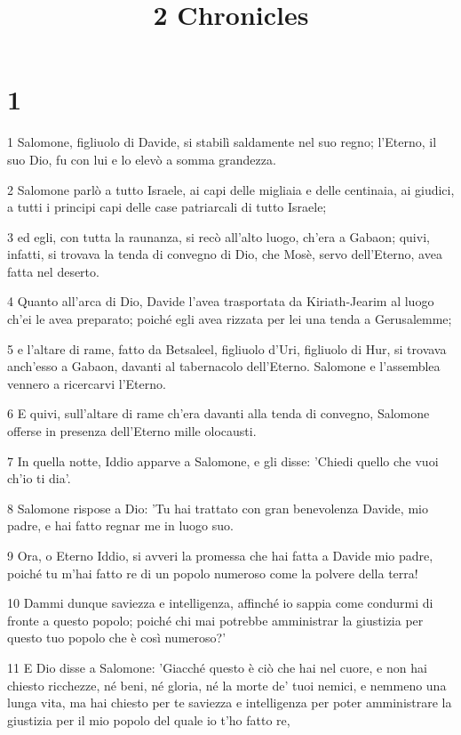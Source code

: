 

\title{2 Chronicles}


\chapter{1}

\par 1 Salomone, figliuolo di Davide, si stabilì saldamente nel suo regno; l'Eterno, il suo Dio, fu con lui e lo elevò a somma grandezza.
\par 2 Salomone parlò a tutto Israele, ai capi delle migliaia e delle centinaia, ai giudici, a tutti i principi capi delle case patriarcali di tutto Israele;
\par 3 ed egli, con tutta la raunanza, si recò all'alto luogo, ch'era a Gabaon; quivi, infatti, si trovava la tenda di convegno di Dio, che Mosè, servo dell'Eterno, avea fatta nel deserto.
\par 4 Quanto all'arca di Dio, Davide l'avea trasportata da Kiriath-Jearim al luogo ch'ei le avea preparato; poiché egli avea rizzata per lei una tenda a Gerusalemme;
\par 5 e l'altare di rame, fatto da Betsaleel, figliuolo d'Uri, figliuolo di Hur, si trovava anch'esso a Gabaon, davanti al tabernacolo dell'Eterno. Salomone e l'assemblea vennero a ricercarvi l'Eterno.
\par 6 E quivi, sull'altare di rame ch'era davanti alla tenda di convegno, Salomone offerse in presenza dell'Eterno mille olocausti.
\par 7 In quella notte, Iddio apparve a Salomone, e gli disse: 'Chiedi quello che vuoi ch'io ti dia'.
\par 8 Salomone rispose a Dio: 'Tu hai trattato con gran benevolenza Davide, mio padre, e hai fatto regnar me in luogo suo.
\par 9 Ora, o Eterno Iddio, si avveri la promessa che hai fatta a Davide mio padre, poiché tu m'hai fatto re di un popolo numeroso come la polvere della terra!
\par 10 Dammi dunque saviezza e intelligenza, affinché io sappia come condurmi di fronte a questo popolo; poiché chi mai potrebbe amministrar la giustizia per questo tuo popolo che è così numeroso?'
\par 11 E Dio disse a Salomone: 'Giacché questo è ciò che hai nel cuore, e non hai chiesto ricchezze, né beni, né gloria, né la morte de' tuoi nemici, e nemmeno una lunga vita, ma hai chiesto per te saviezza e intelligenza per poter amministrare la giustizia per il mio popolo del quale io t'ho fatto re,
